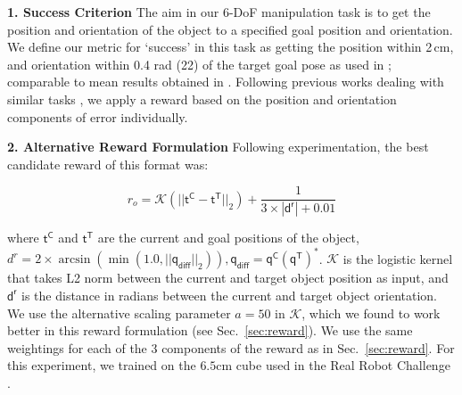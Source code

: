 \documentclass[letterpaper, 10 pt, conference]{ieeeconf}  %
\newcommand{\secref}[1]{Sec.~\ref{#1}}
\begin{document}




\noindent \textbf{1. Success Criterion} The aim in our 6-DoF manipulation task is to get the position and orientation of the object to a specified goal position and orientation. We define our metric for `success' in this task as getting the position within 2\,cm, and orientation within 0.4 rad (22\textdegree) of the target goal pose as used in \citep{openai-sh}; comparable to mean results obtained in \citep{trifinger-benchmarking}. Following previous works dealing with similar tasks \citep{openai-sh, openai-rubiks, causalworld}, we apply a reward based on the position and orientation components of error individually.

\noindent \textbf{2. Alternative Reward Formulation} Following experimentation, the best candidate reward of this format was: 

\begin{equation*}
    r_o = \mathcal{K}(||\mathsf{t^C} - \mathsf{t^T}||_2) + \frac{1}{3 \times \mathsf{|d^r|}+0.01}
\end{equation*}

where $\mathsf{t^C}$ and $\mathsf{t^T}$ are the current and goal positions of the object, $d^r = 2 \times \arcsin (\min(1.0, ||\mathsf{q_{diff}}||_2)), \mathsf{q_{diff}} = \mathsf{q^C} \mathsf{(q^T)^{*}}$. $\mathcal{K}$ is the logistic kernel that takes L2 norm between the current and target object position as input, and $\mathsf{d^r}$ is the distance in radians between the current and target object orientation. We use the alternative scaling parameter $a=50$ in $\mathcal{K}$, which we found to work better in this reward formulation (see \secref{sec:reward}). We use the same weightings for each of the 3 components of the reward as in \secref{sec:reward}. For this experiment, we trained on the $6.5 \text{cm}$ cube used in the Real Robot Challenge \citep{real-robot-challenge}.
\end{document}
